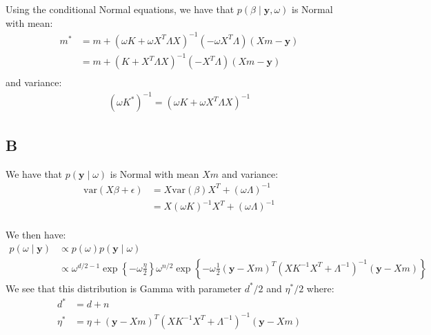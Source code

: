 \documentclass{article}
\begin{document}
Using the conditional Normal equations, we have that \(p(\beta \mid \mathbf{y}, \omega)\) is Normal with mean:
\begin{align*}
m^* &= m + (\omega K + \omega X^T\Lambda X)^{-1}(-\omega X^T \Lambda)(Xm - \mathbf{y})\\
&= m + (K + X^T\Lambda X)^{-1}(-X^T \Lambda)(Xm - \mathbf{y})\\
\end{align*}
and variance:
\begin{align*}
(\omega K^*)^{-1} = (\omega K + \omega X^T\Lambda X)^{-1}
\end{align*}


\subsection*{B}
We have that \(p(\mathbf{y} \mid \omega)\) is Normal with mean \(X m\) and variance:
\begin{align*}
\mbox{var}(X\beta + \epsilon) &= X \mbox{var}(\beta)X^T + (\omega\Lambda)^{-1}\\
&= X (\omega K)^{-1}X^T + (\omega\Lambda)^{-1}\\
\end{align*}

We then have:
\begin{align*}
p(\omega \mid \mathbf{y}) &\propto p(\omega)  p(\mathbf{y} \mid \omega) \\
&\propto \omega^{d/2 - 1} \exp \left\lbrace - \omega\frac{\eta}{2} \right\rbrace \omega^{n/2} \exp \left\lbrace - \omega\frac{1}{2} (\mathbf{y} - Xm)^T (XK^{-1}X^T + \Lambda^{-1})^{-1} (\mathbf{y} - Xm) \right\rbrace
\end{align*}
We see that this distribution is Gamma with parameter \(d^*/2\) and \(\eta^*/2\) where:
\begin{align*}
d^* &= d + n\\
\eta^* &= \eta +  (\mathbf{y} - Xm)^T (XK^{-1}X^T + \Lambda^{-1})^{-1} (\mathbf{y} - Xm)
\end{align*}
\end{document}
